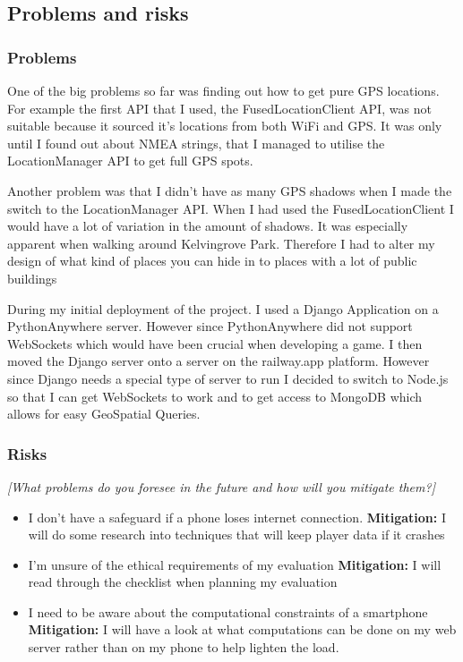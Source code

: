 \documentclass[11pt]{article}
\begin{document}
\subsection{Problems and risks}\label{problems-and-risks}

\subsubsection{Problems}\label{problems}

One of the big problems so far was finding out how to get pure GPS locations. For example the first API that I used, the FusedLocationClient
API, was not suitable because it sourced it's locations from both WiFi and GPS. It was only until I found out about NMEA strings, that I managed
to utilise the LocationManager API to get full GPS spots.
\par
Another problem was that I didn't have as many GPS shadows when I made the switch to the LocationManager API. When I had used the FusedLocationClient
I would have a lot of variation in the amount of shadows. It was especially apparent when walking around Kelvingrove Park. Therefore I had to alter
my design of what kind of places you can hide in to places with a lot of public buildings
\par
During my initial deployment of the project. I used a Django Application on a PythonAnywhere server. However since PythonAnywhere did not support
WebSockets which would have been crucial when developing a game. I then moved the Django server onto a server on the railway.app platform. However
since Django needs a special type of server to run I decided to switch to Node.js so that I can get WebSockets to work and to get access to MongoDB
which allows for easy GeoSpatial Queries.

\subsubsection{Risks}\label{risks}

\emph{{[}What problems do you foresee in the future and how will you
mitigate them?{]}}

\begin{itemize}
    \tightlist
    \item I don't have a safeguard if a phone loses internet connection. \textbf{Mitigation:} I will do some research into techniques that will keep player data if it crashes
    \item I'm unsure of the ethical requirements of my evaluation \textbf{Mitigation:} I will read through the checklist when planning my evaluation
    \item I need to be aware about the computational constraints of a smartphone \textbf{Mitigation:} I will have a look at what computations can be done on my web server rather than on my phone to help lighten the load.
\end{itemize}
\end{document}
